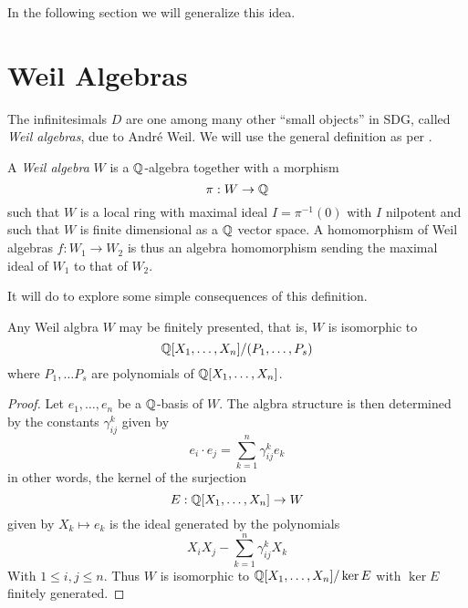 In the following section we will generalize this idea.

\section{Weil Algebras}

The infinitesimals \( D \) are one among many other ``small objects'' in SDG, called \emph{Weil algebras}, due to André Weil. We will use the general definition as per \cite{bun17}.

\begin{defn}
  A \emph{Weil algebra} \( W \) is a \( \mathbb{Q} \)-algebra together with a morphism
  \begin{equation*}
    \pi: W\to\mathbb{Q}
  \end{equation*}
  such that \( W \) is a local ring with maximal ideal \( I=\pi^{-1}(0) \) with \( I \) nilpotent and such that \( W \) is finite dimensional as a \( \mathbb{Q} \) vector space. A homomorphism of Weil algebras \( f:W_1\to W_2 \) is thus an algebra homomorphism sending the maximal ideal of \( W_1 \) to that of \( W_2 \).
\end{defn}



It will do to explore some simple consequences of this definition.

\begin{lemma}
  Any Weil algbra \( W \) may be finitely presented, that is, \( W \) is isomorphic to
  \begin{equation*}
    \mathbb{Q}[X_1,\dots,X_n]/(P_1,\dots,P_s)
  \end{equation*}
  where \( P_1,\dots P_s \) are polynomials of \( \mathbb{Q}[X_1,\dots,X_n] \).
  \label{lm:finpr}
\end{lemma}

\begin{proof}
  Let \( e_1,\dots,e_n \) be a \( \mathbb{Q} \)-basis of \( W \). The algbra structure is then determined by the constants \( \gamma_{ij}^k \) given by
  \begin{equation*}
    e_i\cdot e_j = \sum_{k=1}^n \gamma_{ij}^ke_k
  \end{equation*}
  in other words, the kernel of the surjection
  \begin{equation*}
    E: \mathbb{Q}[X_1,\dots,X_n]\to W
  \end{equation*}
  given by \( X_k\mapsto e_k \) is the ideal generated by the polynomials
  \begin{equation*}
    X_iX_j - \sum_{k=1}^n\gamma_{ij}^kX_k
  \end{equation*}
  With \( 1\leq i,j\leq n \). Thus \( W \) is isomorphic to \( \mathbb{Q}[X_1,\dots,X_n]/\ker E \) with \( \ker E \) finitely generated.
\end{proof}

